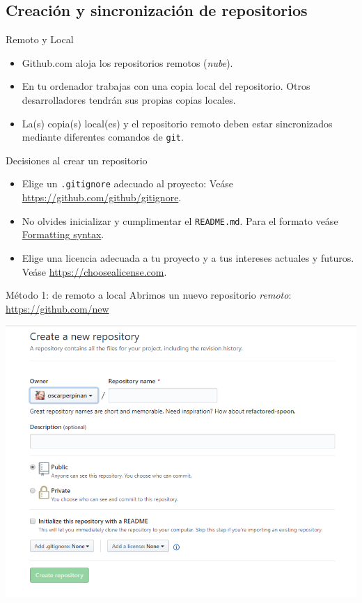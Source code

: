 \documentclass[aspectratio=169, xcolor={usenames,svgnames,dvipsnames}]{beamer}
\begin{document}
\subsection{Creación y sincronización de repositorios}
\label{sec:orgdca4a41}

\begin{frame}[fragile,label={sec:orgc3d0296}]{Remoto y Local}
 \begin{itemize}
\item \alert{Github.com} aloja los \alert{repositorios remotos} (\emph{nube}).
\item En tu ordenador trabajas con una \alert{copia local} del repositorio. Otros desarrolladores tendrán sus propias copias locales.
\item La(s) copia(s) local(es) y el repositorio remoto deben estar \alert{sincronizados} mediante diferentes comandos de \texttt{git}.
\end{itemize}
\end{frame}
\begin{frame}[fragile,label={sec:org580b74f}]{Decisiones al crear un repositorio}
 \begin{itemize}
\item Elige un \alert{\texttt{.gitignore}} adecuado al proyecto: Veáse \url{https://github.com/github/gitignore}.
\item No olvides inicializar y cumplimentar el \alert{\texttt{README.md}}. Para el formato veáse \href{https://help.github.com/articles/basic-writing-and-formatting-syntax/}{Formatting syntax}.
\item Elige una \alert{licencia} adecuada a tu proyecto y a tus intereses actuales y futuros. Veáse \url{https://choosealicense.com}.
\end{itemize}
\end{frame}

\begin{frame}[label={sec:orgd5523a3}]{Método 1: de remoto a local}
Abrimos un nuevo repositorio \emph{remoto}: \url{https://github.com/new}

\begin{center}
\includegraphics[width=.9\linewidth]{figs/GitHub_New_Repository.png}
\end{center}
\end{frame}
\end{document}

